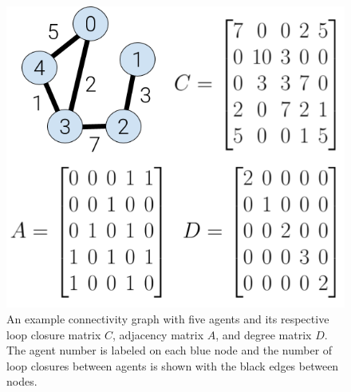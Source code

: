 \documentclass[letterpaper, 10 pt, conference]{ieeeconf}  %
\begin{document}
\begin{figure}
\centering
\includegraphics[width=0.8\linewidth]{connectivity.png}
\caption[An example connectivity graph for the loop closure constraint.]{An example connectivity graph with five agents and its respective loop closure matrix $C$, adjacency matrix $A$, and degree matrix $D$. The agent number is labeled on each blue node and the number of loop closures between agents is shown with the black edges between nodes.
}
\label{fig:connectivity}
\end{figure}
\end{document}
